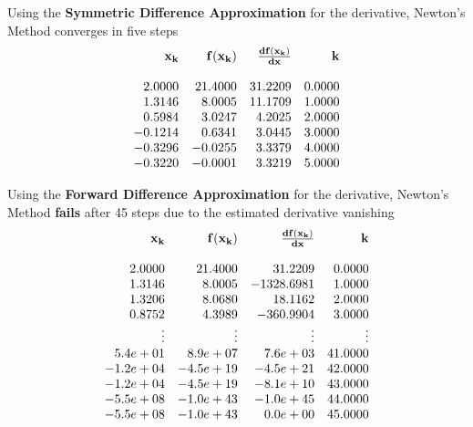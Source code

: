 Using the \textbf{Symmetric Difference Approximation} for the derivative, Newton's Method converges in five steps
\begin{equation}
\begin{array}{rrrr}
{\bf x_k} & {\bf f(x_k) } &   {\bf \frac{df(x_k)}{dx}} &  {\bf k} \\
\\
2.0000 & 21.4000 & 31.2209 & 0.0000 \\
1.3146 & 8.0005 & 11.1709 & 1.0000 \\
0.5984 & 3.0247 & 4.2025 & 2.0000 \\
-0.1214 & 0.6341 & 3.0445 & 3.0000 \\
-0.3296 & -0.0255 & 3.3379 & 4.0000 \\
-0.3220 & -0.0001 & 3.3219 & 5.0000 \\
\end{array}
\end{equation}


Using the \textbf{Forward Difference Approximation} for the derivative, Newton's Method \textbf{fails} after 45 steps due to the estimated derivative vanishing
\begin{equation}
\begin{array}{rrrr}
{\bf x_k} & {\bf f(x_k) } &   {\bf \frac{df(x_k)}{dx}} &  {\bf k} \\
\\
2.0000 & 21.4000 & 31.2209 & 0.0000 \\
1.3146 & 8.0005 & -1328.6981 & 1.0000 \\
1.3206 & 8.0680 & 18.1162 & 2.0000 \\
0.8752 & 4.3989 & -360.9904 & 3.0000 \\
\vdots & \vdots &  \vdots &  \vdots  \\
5.4e+01 & 8.9e+07 & 7.6e+03  & 41.0000 \\
-1.2e+04 & -4.5e+19 & -4.5e+21 & 42.0000 \\
-1.2e+04 & -4.5e+19 & -8.1e+10 & 43.0000 \\
-5.5e+08 & -1.0e+43 & -1.0e+45 & 44.0000 \\
-5.5e+08 & -1.0e+43 & 0.0e+00 & 45.0000 \\
\end{array}
\end{equation}

